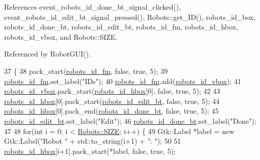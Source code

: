 References event\+\_\+robots\+\_\+id\+\_\+done\+\_\+bt\+\_\+signal\+\_\+clicked(), event\+\_\+robots\+\_\+id\+\_\+edit\+\_\+bt\+\_\+signal\+\_\+pressed(), Robots\+::get\+\_\+\+I\+D(), robots\+\_\+id\+\_\+box, robots\+\_\+id\+\_\+done\+\_\+bt, robots\+\_\+id\+\_\+edit\+\_\+bt, robots\+\_\+id\+\_\+fm, robots\+\_\+id\+\_\+hbox, robots\+\_\+id\+\_\+vbox, and Robots\+::\+S\+I\+ZE.



Referenced by Robot\+G\+U\+I().


\begin{DoxyCode}
37                                 \{
38     pack\_start(\hyperlink{class_robot_g_u_i_a64bb163eaa38fd00aee4db7428d3aae7}{robots\_id\_fm}, \textcolor{keyword}{false}, \textcolor{keyword}{true}, 5);
39     \hyperlink{class_robot_g_u_i_a64bb163eaa38fd00aee4db7428d3aae7}{robots\_id\_fm}.set\_label(\textcolor{stringliteral}{"IDs"});
40     \hyperlink{class_robot_g_u_i_a64bb163eaa38fd00aee4db7428d3aae7}{robots\_id\_fm}.add(\hyperlink{class_robot_g_u_i_ac64edc58bf0527d05a792fbe59237f32}{robots\_id\_vbox});
41     \hyperlink{class_robot_g_u_i_ac64edc58bf0527d05a792fbe59237f32}{robots\_id\_vbox}.pack\_start(\hyperlink{class_robot_g_u_i_a9cbad34535e54602bf18610c56e003a8}{robots\_id\_hbox}[0], \textcolor{keyword}{false}, \textcolor{keyword}{true}, 5);
42 
43     \hyperlink{class_robot_g_u_i_a9cbad34535e54602bf18610c56e003a8}{robots\_id\_hbox}[0].pack\_start(\hyperlink{class_robot_g_u_i_aa74c3aa318e937124b6bd8cc1139ffbd}{robots\_id\_edit\_bt}, \textcolor{keyword}{false}, \textcolor{keyword}{true}, 5);
44     \hyperlink{class_robot_g_u_i_a9cbad34535e54602bf18610c56e003a8}{robots\_id\_hbox}[0].pack\_end(\hyperlink{class_robot_g_u_i_ab69f2927774ee6e1feef6e1e175bf5ba}{robots\_id\_done\_bt}, \textcolor{keyword}{false}, \textcolor{keyword}{true}, 5);
45     \hyperlink{class_robot_g_u_i_aa74c3aa318e937124b6bd8cc1139ffbd}{robots\_id\_edit\_bt}.set\_label(\textcolor{stringliteral}{"Edit"});
46     \hyperlink{class_robot_g_u_i_ab69f2927774ee6e1feef6e1e175bf5ba}{robots\_id\_done\_bt}.set\_label(\textcolor{stringliteral}{"Done"});
47 
48     \textcolor{keywordflow}{for}(\textcolor{keywordtype}{int} i = 0; i < \hyperlink{class_robots_ae9df2f1d345ad6740f0459956cdd4712}{Robots::SIZE}; i++) \{
49         Gtk::Label *label = \textcolor{keyword}{new} Gtk::Label(\textcolor{stringliteral}{"Robot "} + std::to\_string(i+1) + \textcolor{stringliteral}{": "});
50 
51         \hyperlink{class_robot_g_u_i_a9cbad34535e54602bf18610c56e003a8}{robots\_id\_hbox}[i+1].pack\_start(*label, \textcolor{keyword}{false}, \textcolor{keyword}{true}, 5);

\end{DoxyCode}

